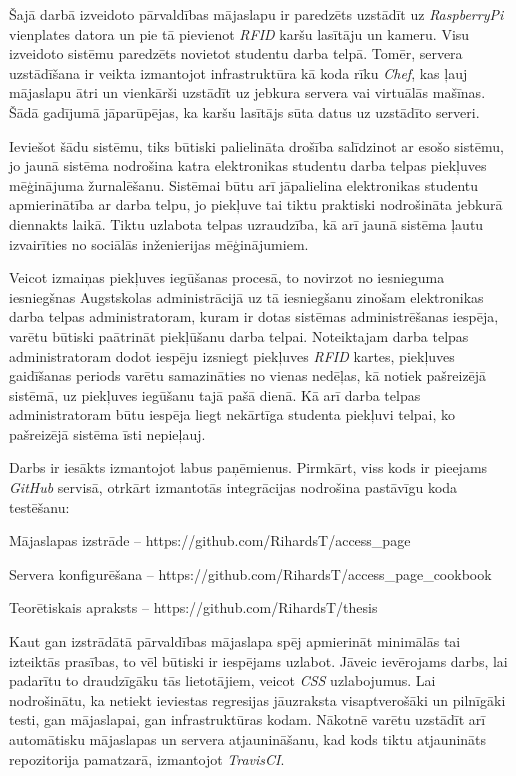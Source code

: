 Šajā darbā izveidoto pārvaldības mājaslapu ir paredzēts uzstādīt uz
\textit{RaspberryPi} vienplates datora un pie tā pievienot \textit{RFID}
karšu lasītāju un kameru. Visu izveidoto sistēmu paredzēts novietot studentu darba telpā.
Tomēr, servera uzstādīšana ir veikta izmantojot infrastruktūra kā koda rīku \textit{Chef}, kas ļauj mājaslapu ātri un vienkārši uzstādīt uz jebkura servera vai virtuālās mašīnas. Šādā gadījumā jāparūpējas, ka karšu lasītājs sūta datus uz uzstādīto serveri.

Ieviešot šādu sistēmu, tiks būtiski palielināta drošība salīdzinot ar esošo sistēmu, jo jaunā sistēma nodrošina katra elektronikas studentu darba telpas piekļuves mēģinājuma žurnalēšanu. Sistēmai būtu arī jāpalielina elektronikas studentu apmierinātība ar darba telpu, jo piekļuve tai tiktu praktiski nodrošināta jebkurā diennakts laikā. Tiktu uzlabota telpas uzraudzība, kā arī jaunā sistēma ļautu izvairīties no sociālās inženierijas mēģinājumiem.

Veicot izmaiņas piekļuves iegūšanas procesā, to novirzot no iesnieguma iesniegšnas Augstskolas administrācijā uz tā iesniegšanu zinošam elektronikas darba telpas administratoram, kuram ir dotas sistēmas administrēšanas iespēja, varētu būtiski paātrināt piekļūšanu darba telpai. Noteiktajam darba telpas administratoram dodot iespēju izsniegt piekļuves \textit{RFID} kartes, piekļuves gaidīšanas periods varētu samazināties no vienas nedēļas, kā notiek pašreizējā sistēmā, uz piekļuves iegūšanu tajā pašā dienā. Kā arī darba telpas administratoram būtu iespēja liegt nekārtīga studenta piekļuvi telpai, ko pašreizējā sistēma īsti nepieļauj.

Darbs ir iesākts izmantojot labus paņēmienus. Pirmkārt, viss kods ir pieejams \textit{GitHub} servisā, otrkārt izmantotās integrācijas nodrošina pastāvīgu koda testēšanu:
\begin{describe}
	\item Mājaslapas izstrāde -- https://github.com/RihardsT/access_page
	\item Servera konfigurēšana -- https://github.com/RihardsT/access_page_cookbook
	\item Teorētiskais apraksts -- https://github.com/RihardsT/thesis
\end{describe}

Kaut gan izstrādātā pārvaldības mājaslapa spēj apmierināt minimālās tai izteiktās prasības, to vēl būtiski ir iespējams uzlabot. Jāveic ievērojams darbs, lai padarītu to draudzīgāku tās lietotājiem, veicot \textit{CSS} uzlabojumus. Lai nodrošinātu, ka netiekt ieviestas regresijas jāuzraksta visaptverošāki un pilnīgāki testi, gan mājaslapai, gan infrastruktūras kodam. Nākotnē varētu uzstādīt arī automātisku mājaslapas un servera atjaunināšanu, kad kods tiktu atjaunināts repozitorija pamatzarā, izmantojot \textit{TravisCI}.


